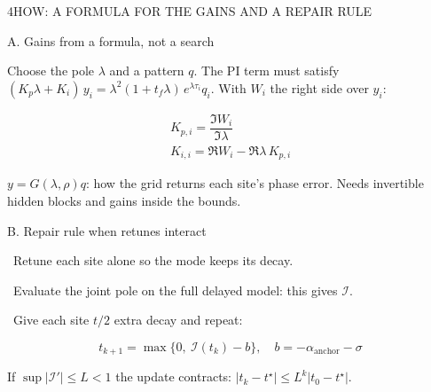 \begin{minipage}[t][\PosterFourHeight][t]{\PosterGridWidth}\vspace{0pt}
  \begin{PosterPanel}{\PosterFourHeight}{4}{HOW: A FORMULA FOR THE GAINS AND A REPAIR RULE}

    \noindent\begin{minipage}[t]{268mm}\vspace{0pt}
      {\Subhead\color{IASDarkGreen}A. Gains from a formula, not a search\par}\vspace{1mm}
      {\FigureSize Choose the pole $\lambda$ and a pattern $q$. The PI term must satisfy $(K_p\lambda+K_i)\,y_i=\lambda^{2}(1+t_f\lambda)\,e^{\lambda\tau_i}q_i$. With $W_i$ the right side over $y_i$:\par}
      {\HeroEquation\color{IASBlue}\[
        \begin{gathered}
          K_{p,i}=\dfrac{\Im W_i}{\Im\lambda}\\[1mm]
          K_{i,i}=\Re W_i-\Re\lambda\,K_{p,i}
        \end{gathered}
      \]}
      \vspace{2mm}
      {\FigureSize $y=G(\lambda,\rho)q$: how the grid returns each site's phase error. Needs invertible hidden blocks and gains inside the bounds.\par}
    \end{minipage}\hfill%
    \begin{minipage}[t]{300mm}\vspace{0pt}
      {\Subhead\color{IASDarkGreen}B. Repair rule when retunes interact\par}\vspace{1mm}
      {\FigureSize {}\ Retune each site alone so the mode keeps its decay.\par}\vspace{1mm}
      {\FigureSize {}\ Evaluate the joint pole on the full delayed model: this gives $\mathcal I$.\par}\vspace{1mm}
      {\FigureSize {}\ Give each site $t/2$ extra decay and repeat:\par}
      {\EquationSize\color{IASBlue}\[
        t_{k+1}=\max\{0,\ \mathcal I(t_k)-b\},\quad b=-\alpha_{\text{anchor}}-\sigma
      \]}
      \vspace{-4mm}
      {\FigureSize If $\sup|\mathcal I'|\le L<1$ the update contracts: $|t_k-t^{\star}|\le L^{k}|t_0-t^{\star}|$.\par}

\end{minipage}
\end{PosterPanel}
\end{minipage}
